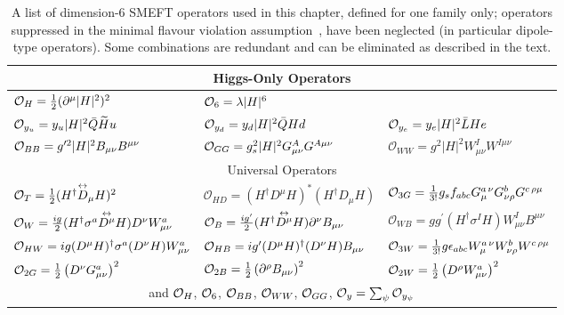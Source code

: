\renewcommand{\arraystretch}{1.4}
\begin{table}[h]
\begin{center}
 \caption{A list of dimension-6 SMEFT operators used in this chapter, defined for one family only; operators suppressed in the minimal flavour violation assumption~\cite{DAmbrosio:2002vsn}, have been neglected (in particular dipole-type operators). Some combinations are redundant and can be eliminated as described in the text. }
\label{tab:dim6ops}
{\small
\begin{tabular}{lll}
 \hline\hline
\multicolumn{3}{c}{Higgs-Only Operators}\\
\hline
${\cal O}_H=\frac{1}{2}(\partial^\mu |H|^2)^2$& ${\cal O}_6=\lambda |H|^6$ & \\
%
${\cal O}_{y_u}   =y_u |H|^2    \bar Q  \widetilde{H} u $ & ${\cal O}_{y_d}   =y_d |H|^2    \bar Q  Hd $ & ${\cal O}_{y_e}   =y_e |H|^2    \bar L  H e $  \\
%
${\cal O}_{BB}={g}^{\prime 2} |H|^2 B_{\mu\nu}B^{\mu\nu}$ & ${\cal O}_{GG}=g_s^2 |H|^2 G_{\mu\nu}^A G^{A\mu\nu}$ & $\mathcal{O}_{WW} = g^2 |H|^2 W^{I}_{\mu \nu} W^{I\mu\nu}$ \\
%
\hline\hline
%
\multicolumn{3}{c}{Universal Operators}\\
\hline
 ${\cal O}_T=\frac{1}{2} (H^\dagger {\overset{\text{\scriptsize$\leftrightarrow$}}{D}_\mu} H)^2$  &  $\mathcal{O}_{H D} = (H^\dagger D^\mu H)^*(H^\dagger D_\mu H)$     & ${\cal O}_{3G}= \frac{1}{3!} g_sf_{abc}G^{a\, \nu}_{\mu}G^{b}_{\nu\rho}G^{c\, \rho\mu}$ \\
  ${\cal O}_W=\frac{ig}{2}( H^\dagger  \sigma^a \overset{\text{\scriptsize$\leftrightarrow$}}{D^\mu} H  )D^\nu  W_{\mu \nu}^a$ & ${\cal O}_B=\frac{ig'}{2}( H^\dagger  \overset{\text{\scriptsize$\leftrightarrow$}}{D^\mu} H  )\partial^\nu  B_{\mu \nu}$  &  $\mathcal{O}_{W\! B} = gg^\prime(H^\dagger \sigma^IH) W^{I}_{\mu\nu} B^{\mu\nu} $\\
   ${\cal O}_{HW}=i g(D^\mu H)^\dagger\sigma^a(D^\nu H)W^a_{\mu\nu}$  &   ${\cal O}_{HB}=i g'(D^\mu H)^\dagger(D^\nu H)B_{\mu\nu}$ & ${\cal O}_{3W}= \frac{1}{3!} g\epsilon_{abc}W^{a\, \nu}_{\mu}W^{b}_{\nu\rho}W^{c\, \rho\mu}$
   \\
     ${\cal O}_{2G}=\frac 12 \left(D^\nu G^a_{\mu\nu}\right)^2$ & ${\cal O}_{2B}=\frac 12 \left(\partial^\rho B_{\mu\nu}\right)^2$ & ${\cal O}_{2W}=\frac 12 \left(D^\rho W^a_{\mu\nu}\right)^2$\\
  \multicolumn{3}{c}{and ${\cal O}_H$, ${\cal O}_6$, ${\cal O}_{BB}$, ${\cal O}_{WW}$, ${\cal O}_{GG}$,  ${\cal O}_y=\sum_\psi{\cal O}_{y_\psi} $ }\\

\end{tabular}}
\end{center}
\end{table}
